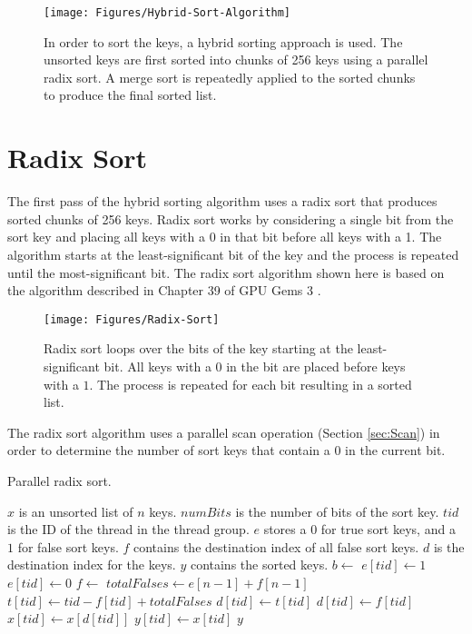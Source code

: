 \begin{figure}[h]
\centering
\texttt{[image: Figures/Hybrid-Sort-Algorithm]}
\decoRule
\caption{In order to sort the keys, a hybrid sorting approach is used. The unsorted keys are first sorted into chunks of 256 keys using a parallel radix sort. A merge sort is repeatedly applied to the sorted chunks to produce the final sorted list.}
\label{fig:Hybrid-Sort-Algorithm}
\end{figure}

\section{Radix Sort}

The first pass of the hybrid sorting algorithm uses a radix sort that produces sorted chunks of 256 keys. Radix sort works by considering a single bit from the sort key and placing all keys with a 0 in that bit before all keys with a 1. The algorithm starts at the least-significant bit of the key and the process is repeated until the most-significant bit. The radix sort algorithm shown here is based on the algorithm described in Chapter 39 of GPU Gems 3 \parencite{34_harris_sengupta_owens_2008}.

\begin{figure}[h]
\centering
\texttt{[image: Figures/Radix-Sort]}
\decoRule
\caption{Radix sort loops over the bits of the key starting at the least-significant bit. All keys with a $0$ in the bit are placed before keys with a $1$. The process is repeated for each bit resulting in a sorted list.}
\label{fig:Radix-Sort}
\end{figure}

The radix sort algorithm uses a parallel scan operation (Section \ref{sec:Scan}) in order to determine the number of sort keys that contain a $0$ in the current bit. 

\begin{algorithm}[h]
\caption{Parallel radix sort.}
\label{alg:Radix_Sort}
\begin{algorithmic}[1]
\Require $x$ is an unsorted list of $n$ keys.
\Require $numBits$ is the number of bits of the sort key.
\Require $tid$ is the ID of the thread in the thread group.
\Require $e$ stores a $0$ for true sort keys, and a $1$ for false sort keys.
\Require $f$ contains the destination index of all false sort keys.
\Require $d$ is the destination index for the keys.
\Ensure $y$ contains the sorted keys.
\State $b \gets$ 
\State $e[tid] \gets 1$
\Else
\State $e[tid] \gets 0$
\EndIf
\State $f \gets$ 
\State $totalFalses \gets e[n-1] + f[n-1]$
\State $t[tid] \gets tid - f[tid] + totalFalses$
\State $d[tid] \gets t[tid]$
\Else
\State $d[tid] \gets f[tid]$
\EndIf
\State $x[tid] \gets x[d[tid]]$
\EndFor
\State $y[tid] \gets x[tid]$
\State \Return $y$
\EndFunction
\end{algorithmic}
\end{algorithm}

